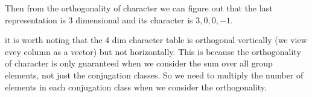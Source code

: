 Then from the orthogonality of character we can figure out that the last representation is 3 dimensional and its character is $ 3,0,0,-1 $.

it is worth noting that the 4 dim character table is orthogonal vertically (we view evey column as a vector) but not horizontally. This is because the orthogonality of character is only guaranteed when we consider the sum over all group elements, not just the conjugation classes. So we need to multiply the number of elements in each conjugation class when we consider the orthogonality.


